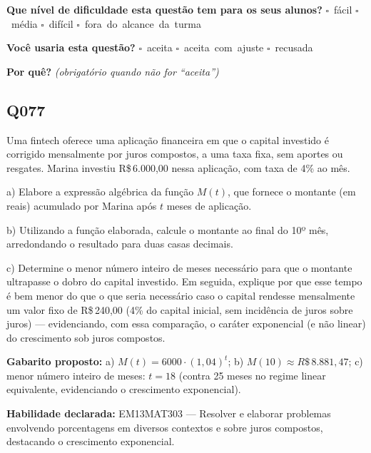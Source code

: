 \documentclass[11pt,a4paper]{article}
\begin{document}
\textbf{Que nível de dificuldade esta questão tem para os seus alunos?}\quad
\mbox{$\square$~fácil} \quad \mbox{$\square$~média} \quad
\mbox{$\square$~difícil} \quad \mbox{$\square$~fora do alcance da turma}

\textbf{Você usaria esta questão?}\quad
\mbox{$\square$~aceita} \quad \mbox{$\square$~aceita com ajuste} \quad
\mbox{$\square$~recusada}

\textbf{Por quê?} \emph{(obrigatório quando não for ``aceita'')}

\underline{\hspace{\linewidth}}

\underline{\hspace{\linewidth}}
\vspace{0.6em}

\begin{samepage}
\subsection*{Q077}
Uma fintech oferece uma aplicação financeira em que o capital investido é corrigido mensalmente por juros compostos, a uma taxa fixa, sem aportes ou resgates. Marina investiu R\$\,6.000,00 nessa aplicação, com taxa de 4\% ao mês.

a) Elabore a expressão algébrica da função $M(t)$, que fornece o montante (em reais) acumulado por Marina após $t$ meses de aplicação.

b) Utilizando a função elaborada, calcule o montante ao final do 10º mês, arredondando o resultado para duas casas decimais.

c) Determine o menor número inteiro de meses necessário para que o montante ultrapasse o dobro do capital investido. Em seguida, explique por que esse tempo é bem menor do que o que seria necessário caso o capital rendesse mensalmente um valor fixo de R\$\,240,00 (4\% do capital inicial, sem incidência de juros sobre juros) — evidenciando, com essa comparação, o caráter exponencial (e não linear) do crescimento sob juros compostos.

\textbf{Gabarito proposto:} a) $M(t) = 6000\cdot(1,04)^t$; b) $M(10) \approx R\$\,8.881{,}47$; c) menor número inteiro de meses: $t = 18$ (contra 25 meses no regime linear equivalente, evidenciando o crescimento exponencial).

\textbf{Habilidade declarada:} EM13MAT303 --- Resolver e elaborar problemas envolvendo porcentagens em diversos contextos e sobre juros compostos, destacando o crescimento exponencial.
\end{samepage}
\end{document}
